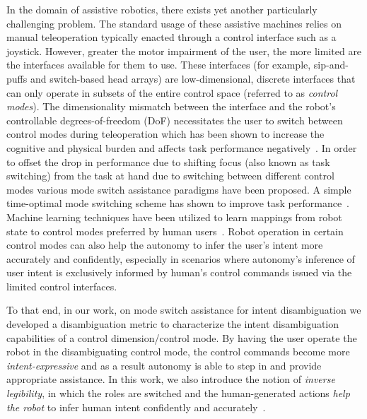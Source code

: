 \documentclass[12pt]{article}
\begin{document}
In the domain of assistive robotics, there exists yet another particularly challenging problem. The standard usage of these assistive machines relies on manual teleoperation typically enacted through a control interface such as a joystick. However, greater the motor impairment of the user, the more limited are the interfaces available for them to use. These interfaces (for example, sip-and-puffs and switch-based head arrays) are low-dimensional, discrete interfaces that can only operate in subsets of the entire control space (referred to as \textit{control modes}). The dimensionality mismatch between the interface and the robot's controllable degrees-of-freedom (DoF) necessitates the user to switch between control modes during teleoperation which has been shown to increase the cognitive and physical burden and affects task performance negatively~\cite{pilarski2012dynamic}.
In order to offset the drop in performance due to shifting focus (also known as task switching) from the task at hand due to switching between different control modes various mode switch assistance paradigms have been proposed. A simple time-optimal mode switching scheme has shown to improve task performance~\cite{herlant2016assistive}. Machine learning techniques have been utilized to learn mappings from robot state to control modes preferred by human users~\cite{jainrobot}. Robot operation in certain control modes can also help the autonomy to infer the user's intent more accurately and confidently, especially in scenarios where autonomy's inference of user intent is exclusively informed by human's control commands issued via the limited control interfaces. 

To that end, in our work, on mode switch assistance for intent disambiguation we developed a disambiguation metric to characterize the intent disambiguation capabilities of a control dimension/control mode. By having the user operate the robot in the disambiguating control mode, the control commands become more \textit{intent-expressive} and as a result autonomy is able to step in and provide appropriate assistance. In this work, we also introduce the notion of \textit{inverse legibility}, in which the roles are switched and the human-generated actions \textit{help the robot} to infer human intent confidently and accurately~\cite{gopinath2017mode}. 
\end{document}
